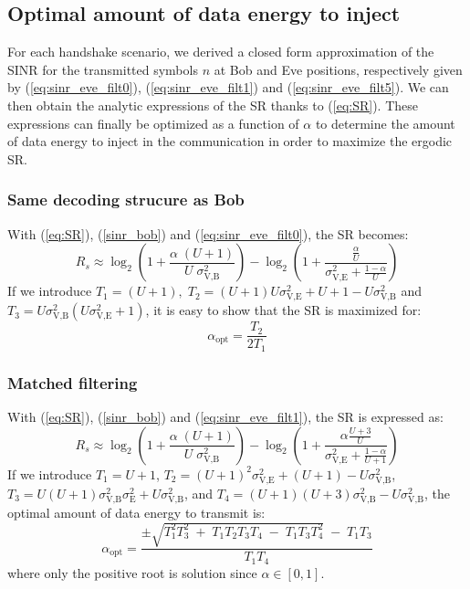 \documentclass[journal,comsoc]{IEEEtran}
\begin{document}
\subsection{Optimal amount of data energy to inject}
\label{subsec:best_alpha}
For each handshake scenario, we derived a closed form approximation of the SINR for the transmitted symbols $n$ at Bob and Eve positions, respectively given by (\ref{eq:sinr_eve_filt0}), (\ref{eq:sinr_eve_filt1}) and (\ref{eq:sinr_eve_filt5}). We can  then obtain the analytic expressions of the SR thanks to (\ref{eq:SR}). These expressions can finally be optimized as a function of $\alpha$ to determine the amount of data energy to inject in the communication in order to maximize the ergodic SR.
\subsubsection{Same decoding strucure as Bob}
 With (\ref{eq:SR}), (\ref{sinr_bob}) and (\ref{eq:sinr_eve_filt0}), the SR becomes:
\begin{equation}
R_s \approx \log_2 \left( 1 +  \frac{\alpha \;(U+1)}{U \; \sigma_{\text{V,B}}^2} \right) - \log_2\left( 1 + \frac{\frac{\alpha}{U}}{\sigma^2_{\text{V,E}}+\frac{1-\alpha}{U}}\right)
\label{eq:SR_anal2_decod_0}
\end{equation}
If we introduce $T_1=(U+1),  \; T_2 = (U+1)U\sigma_{\text{V,E}}^2 + U + 1- U\sigma_{\text{V,B}}^2 $ and $T_3 = U\sigma_{\text{V,B}}^2(U\sigma_{\text{V,E}}^2+1)$, it is easy to show that the SR is maximized for:
\begin{equation}
\alpha_{\text{opt}} = \frac{T_2}{2T_1}
\label{eq:optimal_alpha_decod_0}
\end{equation}


\subsubsection{Matched filtering}
With (\ref{eq:SR}), (\ref{sinr_bob}) and (\ref{eq:sinr_eve_filt1}), the SR is expressed as:
\begin{equation}
R_s \approx \log_2 \left( 1 +  \frac{\alpha \;(U+1)}{U \; \sigma_{\text{V,B}}^2} \right) - \log_2\left( 1 +  \frac{\alpha \frac{U+3}{U}}{\sigma^2_{\text{V,E}} + \frac{1-\alpha}{U+1}}\right)
\label{eq:SR_anal2_decod_1}
\end{equation}
If we introduce $T_1 = U+1$, $T_2 = (U+1)^2\sigma_{\text{V,E}}^2 + (U+1) - U\sigma_{\text{V,B}}^2$, $T_3 = U(U+1)\sigma_{\text{V,B}}^2\sigma_{\text{E}}^2 + U \sigma_{\text{V,B}}^2$, and $T_4=(U+1)(U+3)\sigma_{\text{V,B}}^2-U\sigma_{\text{V,B}}^2$, the optimal amount of data energy to transmit is: 
\begin{equation}
\alpha_{\text{opt}} = \frac{\pm\sqrt{T_1^2 T_3^2 \; + \; T_1 T_2 T_3 T_4 \; - \; T_1 T_3 T_4^2} \; - \; T_1 T_3}{T_1 T_4}
\label{eq:optimal_alpha_decod_1}
\end{equation}
where only the positive root is solution since $\alpha \in [0,1]$.
\end{document}
